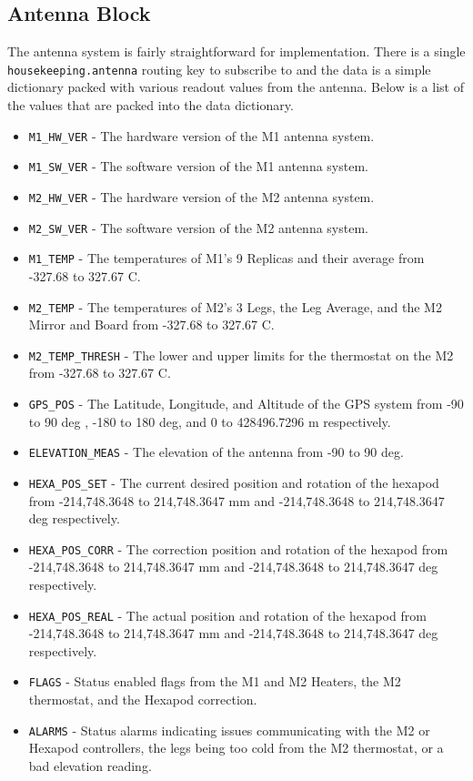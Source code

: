 \subsection{Antenna Block}
The antenna system is fairly straightforward for implementation.
There is a single \texttt{housekeeping.antenna} routing key to subscribe to and the data is a simple dictionary packed with various readout values from the antenna.
Below is a list of the values that are packed into the data dictionary. 
\begin{itemize}
    \item \texttt{M1\_HW\_VER} - The hardware version of the M1 antenna system.
    \item \texttt{M1\_SW\_VER} - The software version of the M1 antenna system.
    \item \texttt{M2\_HW\_VER} - The hardware version of the M2 antenna system.
    \item \texttt{M2\_SW\_VER} - The software version of the M2 antenna system.
    \item \texttt{M1\_TEMP} - The temperatures of M1's 9 Replicas and their average from -327.68 to 327.67 C. 
    \item \texttt{M2\_TEMP} - The temperatures of M2's 3 Legs, the Leg Average, and the M2 Mirror and Board from -327.68 to 327.67 C.
    \item \texttt{M2\_TEMP\_THRESH} - The lower and upper limits for the thermostat on the M2 from -327.68 to 327.67 C.
    \item \texttt{GPS\_POS} - The Latitude, Longitude, and Altitude of the GPS system from -90 to 90 deg , -180 to 180 deg, and 0 to 428496.7296 m respectively.
    \item \texttt{ELEVATION\_MEAS} - The elevation of the antenna from -90 to 90 deg.
    \item \texttt{HEXA\_POS\_SET} - The current desired position and rotation of the hexapod from -214,748.3648 to 214,748.3647 mm and -214,748.3648 to 214,748.3647 deg respectively.
    \item \texttt{HEXA\_POS\_CORR} - The correction position and rotation of the hexapod from -214,748.3648 to 214,748.3647 mm and -214,748.3648 to 214,748.3647 deg respectively.
    \item \texttt{HEXA\_POS\_REAL} - The actual position and rotation of the hexapod from -214,748.3648 to 214,748.3647 mm and -214,748.3648 to 214,748.3647 deg respectively.
    \item \texttt{FLAGS} - Status enabled flags from the M1 and M2 Heaters, the M2 thermostat, and the Hexapod correction. 
    \item \texttt{ALARMS} - Status alarms indicating issues communicating with the M2 or Hexapod controllers, the legs being too cold from the M2 thermostat, or a bad elevation reading.
\end{itemize}

